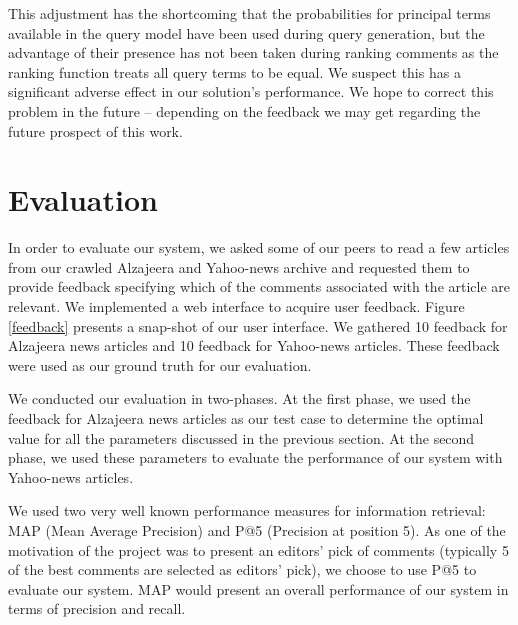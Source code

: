 \documentclass[article]{IEEEtran}
\begin{document}
This adjustment has the shortcoming that the probabilities for principal terms available in the query model have been used during query generation, but the advantage of their presence has not been taken during ranking comments as the ranking function treats all query terms to be equal. We suspect this has a significant adverse effect in our solution's performance. We hope to correct this problem in the future -- depending on the feedback we may get regarding the future prospect of this work.          


\section{Evaluation}
\label{ev}
In order to evaluate our system, we asked some of our peers to read a few articles from our crawled Alzajeera and Yahoo-news archive and requested them to provide feedback specifying which of the comments associated with the article are relevant. We implemented a web interface  to acquire user feedback. Figure \ref{feedback} presents a snap-shot of our user interface. We gathered 10 feedback for Alzajeera news articles and 10 feedback for Yahoo-news articles. These feedback were used as our ground truth for our evaluation.  

We conducted our evaluation in two-phases. At the first phase, we used the feedback  for Alzajeera news articles as our test case to determine the optimal value for all the parameters discussed in the previous section. At the second phase, we used these parameters to evaluate the performance of our system with Yahoo-news articles.

We used two very well known performance measures for information retrieval: MAP (Mean Average Precision) and P@5 (Precision at position 5). As one of the motivation of the project was to present an editors' pick of comments (typically 5 of the best comments are selected as editors' pick), we choose to use P@5 to evaluate our system. MAP would present an overall performance of our system in terms of precision and recall.
\end{document}
